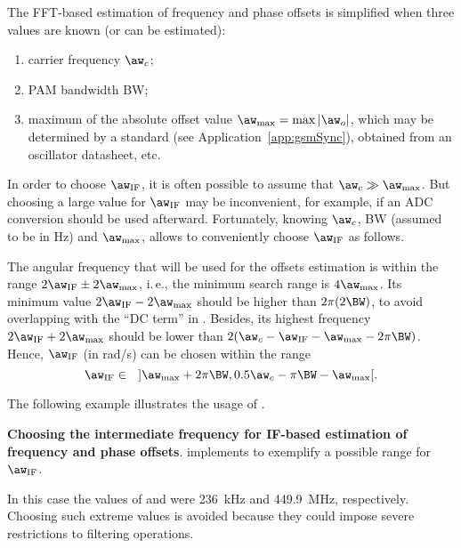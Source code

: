 The FFT-based estimation of frequency and phase offsets is simplified
when three values are known (or can be estimated):
\begin{enumerate}
	\item carrier frequency $\aw_c$;
	\item PAM bandwidth BW;
	\item maximum of the absolute offset value $\aw_{\textrm{max}} = \max |\aw_o|$, which may be determined by a standard (see Application~\ref{app:gsmSync}), obtained from an oscillator datasheet, etc.
\end{enumerate}

In order to choose $\aw_{\textrm{IF}}$, it is often possible to assume that
$\aw_c \gg \aw_{\textrm{max}}$.
But choosing a large value for $\aw_{\textrm{IF}}$ may be inconvenient, for example,
if an ADC conversion should be used afterward. Fortunately, knowing $\aw_c$, BW (assumed to be in Hz) and $\aw_{\textrm{max}}$, allows to conveniently choose $\aw_{\textrm{IF}}$ as follows.

The angular frequency that will be used for the offsets estimation is within the range $2\aw_{\textrm{IF}} \pm 2 \aw_{\textrm{max}}$, i.\,e., the minimum search range is $4 \aw_{\textrm{max}}$. Its minimum value $2\aw_{\textrm{IF}} - 2 \aw_{\textrm{max}}$ should be higher than $2\pi(2 \BW)$, to avoid overlapping with the ``DC term'' in .
Besides, its highest frequency $2\aw_{\textrm{IF}} + 2 \aw_{\textrm{max}}$ should be lower than
$2 (\aw_c - \aw_{\textrm{IF}} - \aw_{\textrm{max}} - 2 \pi \BW)$.
Hence, $\aw_{\textrm{IF}}$ (in rad/s) can be chosen within the range 
\begin{equation}
\aw_{\textrm{IF}} \in \textrm{~~} ]\aw_{\textrm{max}} + 2 \pi \BW, 0.5\aw_c - \pi \BW - \aw_{\textrm{max}}[.
\label{eq:ifRange}
\end{equation}

The following example illustrates the usage of .

\bExample \textbf{Choosing the intermediate frequency for IF-based estimation of frequency and phase offsets}.
 implements  to exemplify a possible range for $\aw_{\textrm{IF}}$.


In this case the values of  and  were 236~kHz and 
449.9~MHz, respectively. Choosing such extreme values is avoided because they could impose severe restrictions to filtering operations.
\eExample

